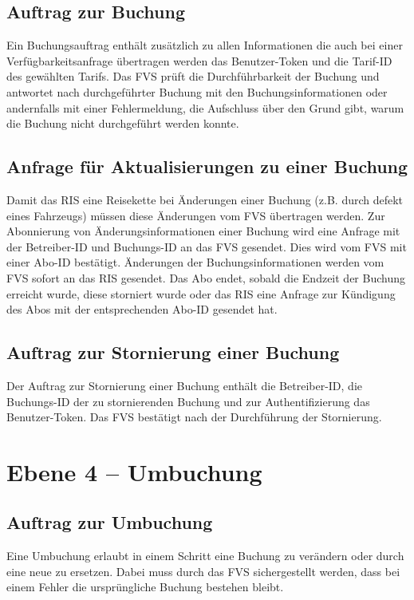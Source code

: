 \subsection{Auftrag zur Buchung}
Ein Buchungsauftrag enthält zusätzlich zu allen Informationen die auch bei einer Verfügbarkeitsanfrage übertragen werden das Benutzer-Token und die Tarif-ID des gewählten Tarifs. Das FVS prüft die Durchführbarkeit der Buchung und antwortet nach durchgeführter Buchung mit den Buchungsinformationen oder andernfalls mit einer Fehlermeldung, die Aufschluss über den Grund gibt, warum die Buchung nicht durchgeführt werden konnte.

\subsection{Anfrage für Aktualisierungen zu einer Buchung}
Damit das RIS eine Reisekette bei Änderungen einer Buchung (z.B. durch defekt eines Fahrzeugs) müssen diese Änderungen vom FVS übertragen werden. Zur Abonnierung von Änderungsinformationen einer Buchung wird eine Anfrage mit der Betreiber-ID und Buchungs-ID an das FVS gesendet. Dies wird vom FVS mit einer Abo-ID bestätigt. Änderungen der Buchungsinformationen werden vom FVS sofort an das RIS gesendet. Das Abo endet, sobald die Endzeit der Buchung erreicht wurde, diese storniert wurde oder das RIS eine Anfrage zur Kündigung des Abos mit der entsprechenden Abo-ID gesendet hat.

\subsection{Auftrag zur Stornierung einer Buchung}
Der Auftrag zur Stornierung einer Buchung enthält die Betreiber-ID, die Buchungs-ID der zu stornierenden Buchung und zur Authentifizierung das Benutzer-Token. Das FVS bestätigt nach der Durchführung der Stornierung.

\section{Ebene 4 -- Umbuchung}

\subsection{Auftrag zur Umbuchung}
Eine Umbuchung erlaubt in einem Schritt eine Buchung zu verändern oder durch eine neue zu ersetzen. Dabei muss durch das FVS sichergestellt werden, dass bei einem Fehler die ursprüngliche Buchung bestehen bleibt.